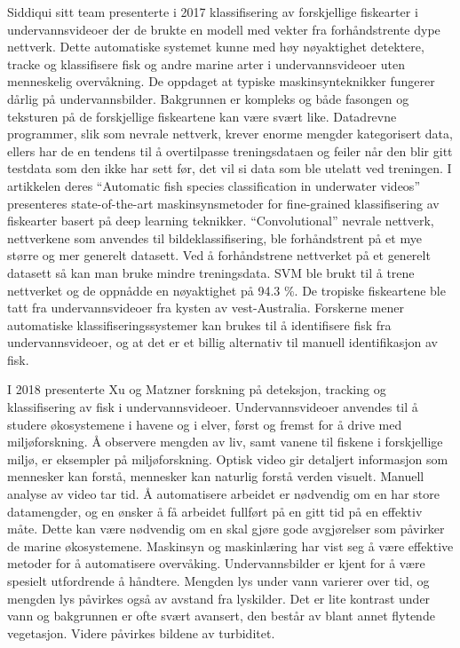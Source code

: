 Siddiqui sitt team presenterte i 2017 klassifisering av forskjellige fiskearter i undervannsvideoer der de brukte en modell med vekter fra forhåndstrente dype nettverk. Dette automatiske systemet kunne med høy nøyaktighet detektere, tracke og klassifisere fisk og andre marine arter i undervannsvideoer uten menneskelig overvåkning. De oppdaget at typiske maskinsynteknikker fungerer dårlig på undervannsbilder. Bakgrunnen er kompleks og både fasongen og teksturen på de forskjellige fiskeartene kan være svært like. Datadrevne programmer, slik som nevrale nettverk, krever enorme mengder kategorisert data, ellers har de en tendens til å overtilpasse treningsdataen og feiler når den blir gitt testdata som den ikke har sett før, det vil si data som ble utelatt ved treningen. I artikkelen deres  ``Automatic fish species classification in underwater videos'' presenteres state-of-the-art maskinsynsmetoder for fine-grained klassifisering av fiskearter basert på deep learning teknikker. ``Convolutional'' nevrale nettverk, nettverkene som anvendes til bildeklassifisering, ble forhåndstrent på et mye større og mer generelt datasett. Ved å forhåndstrene nettverket på et generelt datasett så kan man bruke mindre treningsdata. SVM ble brukt til å trene nettverket og de oppnådde en nøyaktighet på 94.3 \%. De tropiske fiskeartene ble tatt fra undervannsvideoer fra kysten av vest-Australia. Forskerne mener automatiske klassifiseringssystemer kan brukes til å identifisere fisk fra undervannsvideoer, og at det er et billig alternativ til manuell identifikasjon av fisk. \cite{Siddiqui m.fl. 2017}

I 2018 presenterte Xu og Matzner forskning på deteksjon, tracking og klassifisering av fisk i undervannsvideoer. Undervannsvideoer anvendes til å studere økosystemene i havene og i elver, først og fremst for å drive med miljøforskning. Å observere mengden av liv, samt vanene til fiskene i forskjellige miljø, er eksempler på miljøforskning. Optisk video gir detaljert informasjon som mennesker kan forstå, mennesker kan naturlig forstå verden visuelt. Manuell analyse av video tar tid. Å automatisere arbeidet er nødvendig om en har store datamengder, og en ønsker å få arbeidet fullført på en gitt tid på en effektiv måte. Dette kan være nødvendig om en skal gjøre gode avgjørelser som påvirker de marine økosystemene. Maskinsyn og maskinlæring har vist seg å være effektive metoder for å automatisere overvåking. Undervannsbilder er kjent for å være spesielt utfordrende å håndtere. Mengden lys under vann varierer over tid, og mengden lys påvirkes også av avstand fra lyskilder. Det er lite kontrast under vann og bakgrunnen er ofte svært avansert, den består av blant annet flytende vegetasjon. Videre påvirkes bildene av turbiditet. \cite{Xu og Matzner 2018}

